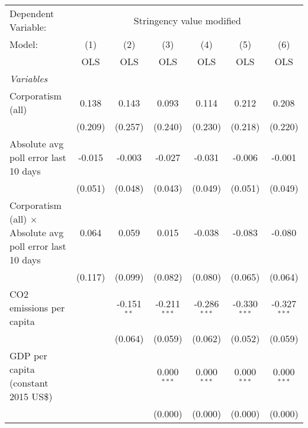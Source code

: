 
\begingroup
\centering
\begin{tabular}{lcccccc}
   \toprule
   Dependent Variable: & \multicolumn{6}{c}{Stringency value modified}\\
   Model:                                                           & (1)     & (2)           & (3)            & (4)            & (5)            & (6)\\  
                                                                    &  OLS    & OLS           & OLS            & OLS            & OLS            & OLS\\  
   \midrule
   \emph{Variables}\\
   Corporatism (all)                                                & 0.138   & 0.143         & 0.093          & 0.114          & 0.212          & 0.208\\   
                                                                    & (0.209) & (0.257)       & (0.240)        & (0.230)        & (0.218)        & (0.220)\\   
   Absolute avg poll error last 10 days                             & -0.015  & -0.003        & -0.027         & -0.031         & -0.006         & -0.001\\   
                                                                    & (0.051) & (0.048)       & (0.043)        & (0.049)        & (0.051)        & (0.049)\\   
   Corporatism (all) $\times$ Absolute avg poll error last 10 days  & 0.064   & 0.059         & 0.015          & -0.038         & -0.083         & -0.080\\   
                                                                    & (0.117) & (0.099)       & (0.082)        & (0.080)        & (0.065)        & (0.064)\\   
   CO2 emissions per capita                                         &         & -0.151$^{**}$ & -0.211$^{***}$ & -0.286$^{***}$ & -0.330$^{***}$ & -0.327$^{***}$\\   
                                                                    &         & (0.064)       & (0.059)        & (0.062)        & (0.052)        & (0.059)\\   
   GDP per capita (constant 2015 US\$)                              &         &               & 0.000$^{***}$  & 0.000$^{***}$  & 0.000$^{***}$  & 0.000$^{***}$\\   
                                                                    &         &               & (0.000)        & (0.000)        & (0.000)        & (0.000)\\   

\end{tabular}
